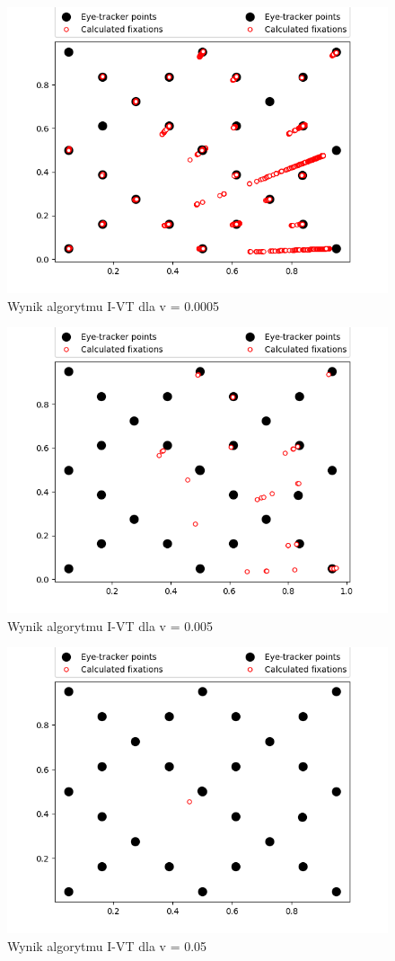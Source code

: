 \begin{figure}[H]
    \centering
    \captionsetup{justification=centering,margin=2cm}
    \includegraphics[width=0.8\linewidth]{resources/ivtresults/file2.png}
    \caption{Wynik algorytmu I-VT dla v = 0.0005}
    \label{fig:ivt2}
\end{figure}
\begin{figure}[H]
    \centering
    \captionsetup{justification=centering,margin=2cm}
    \includegraphics[width=0.8\linewidth]{resources/ivtresults/file3.png}
    \caption{Wynik algorytmu I-VT dla v = 0.005}
    \label{fig:ivt3}
\end{figure}
\begin{figure}[H]
    \centering
    \captionsetup{justification=centering,margin=2cm}
    \includegraphics[width=0.8\linewidth]{resources/ivtresults/file4.png}
    \caption{Wynik algorytmu I-VT dla v = 0.05}
    \label{fig:ivt4}
\end{figure}

